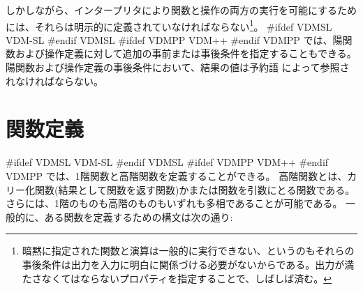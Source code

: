 \documentclass[\pformat,12pt]{jarticle}
\newcommand{\vdmslpp}[2]{%
#ifdef VDMSL
#1
#endif VDMSL
#ifdef VDMPP
#2
#endif VDMPP
}
\newcommand{\vdmpp}{VDM++}
\begin{document}
しかしながら、インタープリタにより関数と操作の両方の実行を可能にするためには、それらは明示的に定義されていなければならない\footnote{暗黙に指定された関数と演算は一般的に実行できない、というのもそれらの事後条件は出力を入力に明白に関係づける必要がないからである。出力が満たさなくてはならないプロパティを指定することで、しばしば済む。}。
\vdmslpp{VDM-SL}{\vdmpp}では、陽関数および操作定義に対して追加の事前または事後条件を指定することもできる。
陽関数および操作定義の事後条件において、結果の値は予約語 によって参照されなければならない。
 
\section{関数定義}\label{functiondef}

\vdmslpp{VDM-SL}{\vdmpp}では、1階関数と高階関数を定義することができる。 
高階関数とは、カリー化関数(結果として関数を返す関数)かまたは関数を引数にとる関数である。
さらには、1階のものも高階のものもいずれも多相であることが可能である。
一般的に、ある関数を定義するための構文は次の通り:







\end{document}
